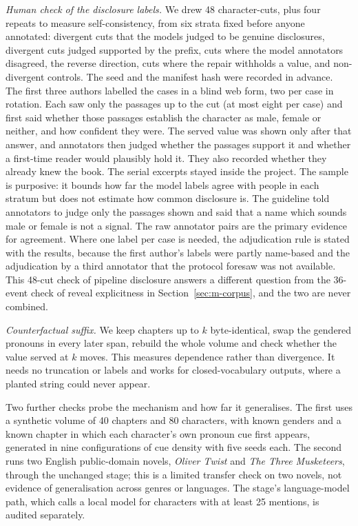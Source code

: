 \documentclass[sn-mathphys]{sn-jnl}%
\theoremstyle{thmstyleone}%
\theoremstyle{thmstyletwo}%
\theoremstyle{thmstylethree}%
\begin{document}
\emph{Human check of the disclosure labels.} We drew 48 character-cuts, plus four repeats to measure self-consistency, from six strata fixed before anyone annotated: divergent cuts that the models judged to be genuine disclosures, divergent cuts judged supported by the prefix, cuts where the model annotators disagreed, the reverse direction, cuts where the repair withholds a value, and non-divergent controls. The seed and the manifest hash were recorded in advance. The first three authors labelled the cases in a blind web form, two per case in rotation. Each saw only the passages up to the cut (at most eight per case) and first said whether those passages establish the character as male, female or neither, and how confident they were. The served value was shown only after that answer, and annotators then judged whether the passages support it and whether a first-time reader would plausibly hold it. They also recorded whether they already knew the book. The serial excerpts stayed inside the project. The sample is purposive: it bounds how far the model labels agree with people in each stratum but does not estimate how common disclosure is. The guideline told annotators to judge only the passages shown and said that a name which sounds male or female is not a signal. The raw annotator pairs are the primary evidence for agreement. Where one label per case is needed, the adjudication rule is stated with the results, because the first author's labels were partly name-based and the adjudication by a third annotator that the protocol foresaw was not available. This 48-cut check of pipeline disclosure answers a different question from the 36-event check of reveal explicitness in Section~\ref{sec:m-corpus}, and the two are never combined.

\emph{Counterfactual suffix.} We keep chapters up to $k$ byte-identical, swap the gendered pronouns in every later span, rebuild the whole volume and check whether the value served at $k$ moves. This measures dependence rather than divergence. It needs no truncation or labels and works for closed-vocabulary outputs, where a planted string could never appear.

Two further checks probe the mechanism and how far it generalises. The first uses a synthetic volume of 40 chapters and 80 characters, with known genders and a known chapter in which each character's own pronoun cue first appears, generated in nine configurations of cue density with five seeds each. The second runs two English public-domain novels, \emph{Oliver Twist} and \emph{The Three Musketeers}, through the unchanged stage; this is a limited transfer check on two novels, not evidence of generalisation across genres or languages. The stage's language-model path, which calls a local model for characters with at least 25 mentions, is audited separately.
\end{document}
